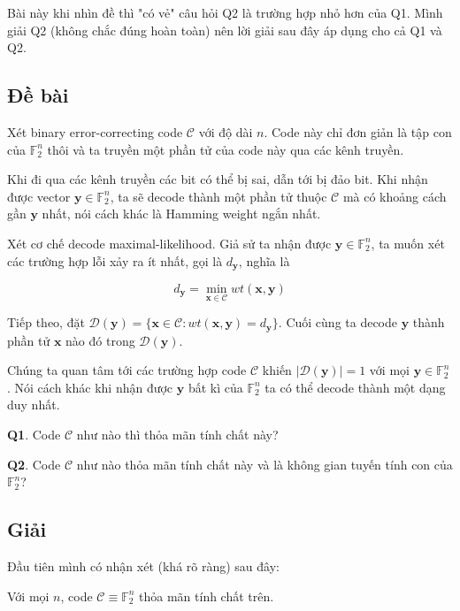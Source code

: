Bài này khi nhìn đề thì "có vẻ" câu hỏi Q2 là trường hợp nhỏ hơn của Q1. Mình giải Q2 (không chắc đúng hoàn toàn) nên lời giải sau đây áp dụng cho cả Q1 và Q2.

\subsection*{Đề bài}

Xét binary error-correcting code $\mathcal{C}$ với độ dài $n$. Code này chỉ đơn giản là tập con của $\mathbb{F}_2^n$ thôi và ta truyền một phần tử của code này qua các kênh truyền.

Khi đi qua các kênh truyền các bit có thể bị sai, dẫn tới bị đảo bit. Khi nhận được vector $\bm{y} \in \mathbb{F}_2^n$, ta sẽ decode thành một phần tử thuộc $\mathcal{C}$ mà có khoảng cách gần $\bm{y}$ nhất, nói cách khác là Hamming weight ngắn nhất.

Xét cơ chế decode maximal-likelihood. Giả sử ta nhận được $\bm{y} \in \mathbb{F}_2^n$, ta muốn xét các trường hợp lỗi xảy ra ít nhất, gọi là $d_{\bm{y}}$, nghĩa là

\begin{equation*}
    d_{\bm{y}} = \min_{\bm{x} \in \mathcal{C}} wt(\bm{x}, \bm{y})
\end{equation*}

Tiếp theo, đặt $\mathcal{D} (\bm{y}) = \{ \bm{x} \in \mathcal{C} : wt(\bm{x}, \bm{y}) = d_{\bm{y}} \}$. Cuối cùng ta decode $\bm{y}$ thành phần tử $\bm{x}$ nào đó trong $\mathcal{D}(\bm{y})$.

Chúng ta quan tâm tới các trường hợp code $\mathcal{C}$ khiến $\lvert \mathcal{D}(\bm{y}) \rvert = 1$ với mọi $\bm{y} \in \mathbb{F}_2^n$. Nói cách khác khi nhận được $\bm{y}$ bất kì của $\mathbb{F}_2^n$ ta có thể decode thành một dạng duy nhất.

\textbf{Q1}. Code $\mathcal{C}$ như nào thì thỏa mãn tính chất này?

\textbf{Q2}. Code $\mathcal{C}$ như nào thỏa mãn tính chất này và là không gian tuyến tính con của $\mathbb{F}_2^n$?

\subsection*{Giải}

Đầu tiên mình có nhận xét (khá rõ ràng) sau đây:

\begin{remark}
    Với mọi $n$, code $\mathcal{C} \equiv \mathbb{F}_2^n$ thỏa mãn tính chất trên.
\end{remark}

